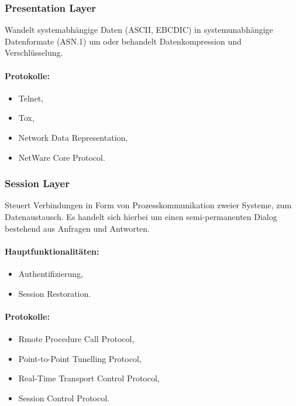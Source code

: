 \documentclass{scrartcl}
\begin{document}
    \subsubsection{Presentation Layer}
    \label{subsubsection:OSI_presentation_layer}
    Wandelt systemabhängige Daten (ASCII, EBCDIC) in systemunabhängige Datenformate (ASN.1) um oder behandelt Datenkompression und Verschlüsselung.
    
    \paragraph{Protokolle:}
    \begin{itemize}
        \item Telnet,
        \item Tox,
        \item Network Data Representation,
        \item NetWare Core Protocol.
    \end{itemize}

    \subsubsection{Session Layer}
    \label{subsubsection:OSI_session_layer}
    Steuert Verbindungen in Form von Prozesskommunikation zweier Systeme, zum Datenaustausch. 
    Es handelt sich hierbei um einen semi-permanenten Dialog bestehend aus Anfragen und Antworten.

    \paragraph{Hauptfunktionalitäten:}
    \begin{itemize}
        \item Authentifizierung,
        \item Session Restoration.
    \end{itemize}

    \paragraph{Protokolle:}
    \begin{itemize}
        \item Rmote Procedure Call Protocol,
        \item Point-to-Point Tunelling Protocol,
        \item Real-Time Transport Control Protocol, 
        \item Session Control Protocol.
    \end{itemize}
\end{document}
